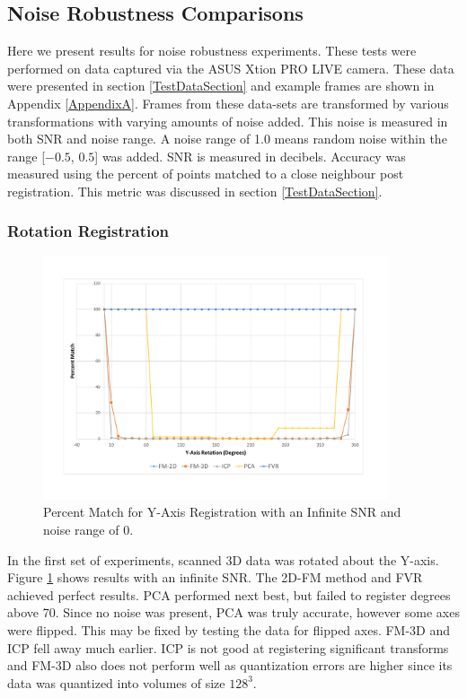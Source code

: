 
\subsection{Noise Robustness Comparisons}


Here we present results for noise robustness experiments. These tests were performed on data captured via the ASUS Xtion PRO LIVE camera. These data were presented in section \ref{TestDataSection} and example frames are shown in Appendix \ref{AppendixA}. Frames from these data-sets are transformed by various transformations with varying amounts of noise added. This noise is measured in both SNR and noise range. A noise range of 1.0 means random noise within the range [$-0.5$, $0.5$] was added. SNR is measured in decibels. Accuracy was measured using the percent of points matched to a close neighbour post registration. This metric was discussed in section \ref{TestDataSection}. 

\subsubsection{Rotation Registration}

\begin{figure}[!htb]
\centering
\includegraphics[width=4.0in]{images/results/noise/YRNoise0}
\caption{Percent Match for Y-Axis Registration with an Infinite SNR and noise range of $0$.}
\label{fig:YRNoise0}
\end{figure}

In the first set of experiments, scanned 3D data was rotated about the Y-axis. Figure \ref{fig:YRNoise0} shows results with an infinite SNR. The 2D-FM method and FVR achieved perfect results. PCA performed next best, but failed to register degrees above 70. Since no noise was present, PCA was truly accurate, however some axes were flipped. This may be fixed by testing the data for flipped axes. FM-3D and ICP fell away much earlier. ICP is not good at registering significant transforms and FM-3D also does not perform well as quantization errors are higher since its data was quantized into volumes of size $128^3$. \\


